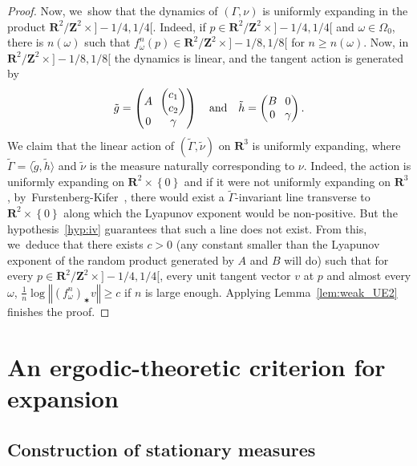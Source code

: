 \documentclass[JEP,XML,SOM,Unicode,published]{cedram}
\newcommand{\set}[1]{\left\{#1\right\}}
\newcommand{\norm}[1]{{\left\Vert#1\right\Vert}}
\newcommand{\unsur}[1]{\frac{1}{#1}}
\def\R{\mathbf{R}}
\def\Z{\mathbf{Z}}
\theoremstyle{plain}
\theoremstyle{definition}
\begin{document}
\begin{proof}
Now, we~show that the dynamics of $(\Gamma, \nu)$ is uniformly expanding in the product
$\R^2/\Z^2 \times{}]-1/4, 1/4[$. Indeed, if $p\in \R^2/\Z^2 \times{}]-1/4, 1/4[$ and $\omega\in \Omega_0$, there
is $n(\omega)$ such that $f^n_\omega(p)\in \R^2/\Z^2 \times{}]-1/8, 1/8[$ for $n\geq n(\omega)$.
Now, in $\R^2/\Z^2 \times{}]-1/8, 1/8[$ the dynamics is linear, and the tangent action is generated by
\begin{equation*}\arraycolsep3.5pt
\tilde g = \begin{pmatrix}A & \begin{pmatrix} c_1 \\ c_2 \end{pmatrix} \\ 0 & \gamma
\end{pmatrix}
\quad\text{and}\quad
\tilde h = \begin{pmatrix}B& 0 \\ 0 & \gamma
\end{pmatrix}.
\end{equation*}
We claim that the linear action of $(\tilde \Gamma, \tilde \nu)$ on $\R^3$ is uniformly expanding,
where $\tilde \Gamma = \langle{\tilde g, \tilde h}\rangle$ and $\tilde \nu$ is the measure naturally
corresponding to $\nu$. Indeed, the action is uniformly expanding on $\R^2\times \set{0}$ and
if it were not uniformly expanding on $\R^3$, by~Furstenberg-Kifer~\cite{furstenberg-kifer},
there would exist a $\tilde \Gamma$-invariant line transverse to $\R^2\times \set{0}$ along which the Lyapunov exponent would be non-positive. But the hypothesis~\eqref{hyp:iv} guarantees that such a line does not exist.
From this, we~deduce that there exists $c>0$ (any constant smaller than the Lyapunov exponent
of the random product generated by $A$ and $B$ will do)
such that
for every $p \in \R^2/\Z^2 \times{}]-1/4, 1/4[$, every unit tangent vector $v$ at $p$
and almost every $\omega$, $\unsur{n} \log \norm{(f_\omega^n)_\varstar v}\geq c$ if $n$ is large enough.
Applying Lemma~\ref{lem:weak_UE2} finishes the proof.
\end{proof}

\section{An ergodic-theoretic criterion for expansion}\label{sec:criterion}

\subsection{Construction of stationary measures}
\label{subs:stationary}
\end{document}
